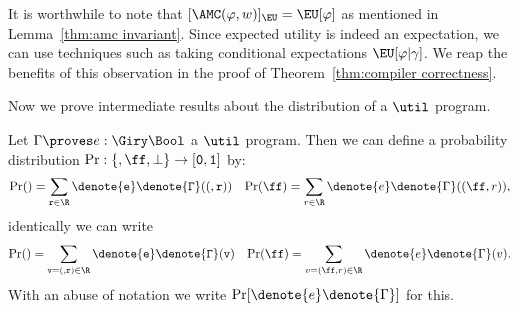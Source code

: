It is worthwhile to note that $[\AMC(\varphi,w)]_{\EU} = \EU[\varphi]$ as mentioned in Lemma~\ref{thm:amc invariant}. 
Since expected utility is indeed an expectation, we can use 
techniques such as taking conditional expectations $\EU[\varphi | \gamma]$. We reap the benefits of this observation in the proof of
Theorem~\ref{thm:compiler correctness}.


Now we prove intermediate results about the distribution of a $\util$ program.

\begin{definition}
  Let $\Gamma \proves e : \Giry \Bool$ a $\util$ program. 
  Then we can define a probability distribution $\Pr : \{\tt, \ff, \bot\} \to [0,1]$
  by:
  \begin{align*}
    \Pr(\tt) = \sum_{r \in \R} \denote{e} \denote{\Gamma}((\tt,r))
    &&
    \Pr(\ff) = \sum_{r \in \R} \denote{e} \denote{\Gamma}((\ff,r)),
  \end{align*}
  identically we can write
  \begin{align*}
    \Pr(\tt) = \sum_{v = (\tt,r) \in \R} \denote{e} \denote{\Gamma}(v)
    &&
    \Pr(\ff) = \sum_{v = (\ff,r) \in \R} \denote{e} \denote{\Gamma}(v).
  \end{align*}
  With an abuse of notation we write $\Pr[\denote{e} \denote{\Gamma}]$ for this.
\end{definition}

